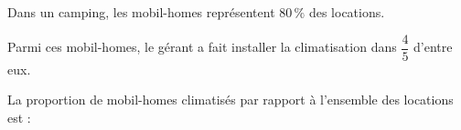 
Dans un camping, les mobil-homes représentent $80\,\%$ des locations.

Parmi ces mobil-homes, le gérant a fait installer la climatisation dans $\dfrac{4}{5}$ d'entre eux.

La proportion de mobil-homes climatisés par rapport à l'ensemble des locations est :

\smallskip
{}
